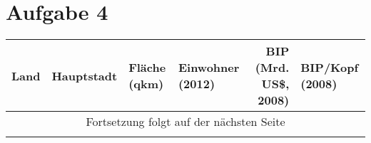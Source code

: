 \documentclass[10pt]{article}
\begin{document}
\newpage 
\section{Aufgabe 4}

\scriptsize
\setlength{\LTleft}{-2cm}

\begin{longtable}{@{} l l l l l l @{}}
\toprule
    Land & Hauptstadt & Fläche (qkm) & Einwohner (2012) & \multicolumn{1}{r}{BIP (Mrd. US\$, 2008)} & BIP/Kopf (2008) \\
\midrule
\endhead 
\bottomrule
\multicolumn{6}{c}{Fortsetzung folgt auf der nächsten Seite}\\
\endfoot
\bottomrule
\endlastfoot


\end{longtable}
\end{document}
